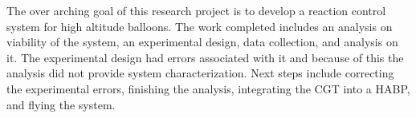 The over arching goal of this research project is to develop a reaction control system for high altitude balloons. The work completed includes an analysis on viability of the system, an experimental design, data collection, and analysis on it. The experimental design had errors associated with it and because of this the analysis did not provide system characterization. Next steps include correcting the experimental errors, finishing the analysis, integrating the CGT into a HABP, and flying the system.
